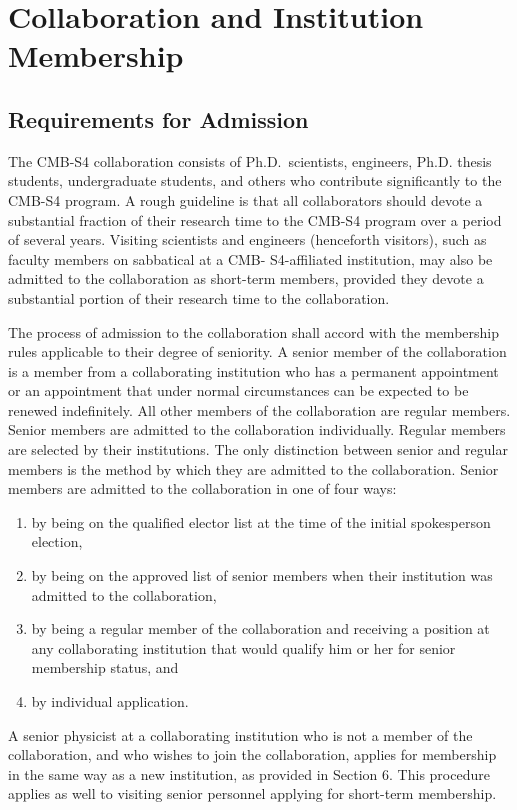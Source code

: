 \section{Collaboration and Institution Membership}

\subsection{Requirements for Admission}

The CMB-S4 collaboration consists of Ph.D.\ scientists, engineers, Ph.D. thesis students, undergraduate students, and others who contribute significantly to the CMB-S4 program. A rough guideline is that all collaborators should devote a substantial fraction of their research time to the CMB-S4 program over a period of several years.
Visiting scientists and engineers (henceforth visitors), such as faculty members on sabbatical at a CMB- S4-affiliated institution, may also be admitted to the collaboration as short-term members, provided they devote a substantial portion of their research time to the collaboration.

The process of admission to the collaboration shall accord with the membership rules applicable to their degree of seniority. A senior member of the collaboration is a member from a collaborating institution who has a permanent appointment or an appointment that under normal circumstances can be expected to be renewed indefinitely. All other members of the collaboration are regular members. Senior members are admitted to the collaboration individually. Regular members are selected by their institutions. The only distinction between senior and regular members is the method by which they are admitted to the collaboration.
Senior members are admitted to the collaboration in one of four ways:
\begin{enumerate}
\item by being on the qualified elector list at the time of the initial spokesperson election,
\item by being on the approved list of senior members when their institution was admitted to the collaboration,
\item by being a regular member of the collaboration and receiving a position at any collaborating institution that would qualify him or her for senior membership status,
and
\item by individual application.
\end{enumerate}
A senior physicist at a collaborating institution who is not a member of the collaboration, and who wishes to join the collaboration, applies for membership in the same way as a new institution, as provided in Section 6. This procedure applies as well to visiting senior personnel applying for short-term membership.

